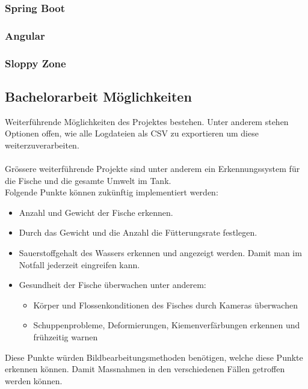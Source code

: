 \documentclass[../main.tex]{subfiles}
\begin{document}
	\subsubsection{Spring Boot}
	
	\subsubsection{Angular}
	
	\subsubsection{Sloppy Zone}
	
	\subsection{Bachelorarbeit Möglichkeiten}
	Weiterführende Möglichkeiten des Projektes bestehen. Unter anderem stehen Optionen offen, wie alle Logdateien als CSV zu exportieren um diese weiterzuverarbeiten.
	\\ \\
	Grössere weiterführende Projekte sind unter anderem ein Erkennungssystem für die Fische und die gesamte Umwelt im Tank. \\
	Folgende Punkte können zukünftig implementiert werden:
	\begin{itemize}
		\item Anzahl und Gewicht der Fische erkennen.
		\item Durch das Gewicht und die Anzahl die Fütterungsrate festlegen.
		\item Sauerstoffgehalt des Wassers erkennen und angezeigt werden. Damit man im Notfall jederzeit eingreifen kann.
		\item Gesundheit der Fische überwachen unter anderem:
		\begin{itemize}
			\item Körper und Flossenkonditionen des Fisches durch Kameras überwachen
			\item Schuppenprobleme, Deformierungen, Kiemenverfärbungen erkennen und frühzeitig warnen
		\end{itemize}
	\end{itemize}	
	Diese Punkte würden Bildbearbeitungsmethoden benötigen, welche diese Punkte erkennen können. Damit Massnahmen in den verschiedenen Fällen getroffen werden können. 
	\par 
\end{document}
